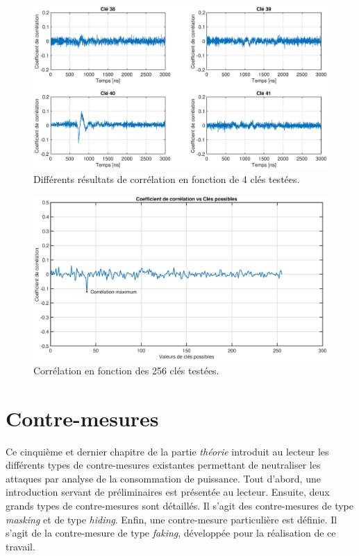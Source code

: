 \documentclass[oneside]{book}
\begin{document}
 \begin{figure}[htbp]
    \hspace{-2cm}
    \includegraphics[scale=0.4]{image/4KeysEx}
    \caption{Différents résultats de corrélation en fonction de 4 clés testées.}
    \label{fig:4KeysEx}
\end{figure}

\begin{figure}[htbp]
    \hspace{-2cm}
    \includegraphics[scale=0.4]{image/TrueKey}
    \caption{Corrélation en fonction des 256 clés testées.}
    \label{fig:TrueKey}
\end{figure}




\newpage


\chapter{Contre-mesures}
\label{chap:contremesure}

Ce cinquième et dernier chapitre de la partie \textit{théorie} introduit au lecteur les différents types de contre-mesures existantes permettant de neutraliser les attaques par analyse de la consommation de puissance. Tout d'abord, une introduction servant de préliminaires est présentée au lecteur. Ensuite, deux grands types de contre-mesures sont détaillés. Il s'agit des contre-mesures de type \textit{masking} et de type \textit{hiding}. Enfin, une contre-mesure particulière est définie. Il s'agit de la contre-mesure de type \textit{faking}, développée pour la réalisation de ce travail.
\end{document}

